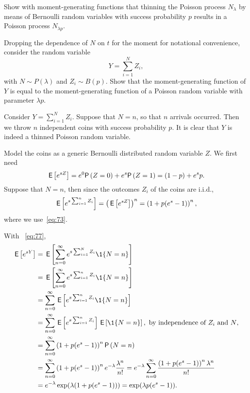 \begin{exercise}
 Show with moment-generating functions that thinning the Poisson process $N_\lambda$ by means of Bernoulli random variables with success probability $p$ results in a Poisson process $N_{\lambda p}$.
\begin{hint}
Dropping the dependence of $N$ on $t$ for the moment for notational convenience, consider the random variable 
 \begin{equation*}
 Y = \sum_{i=1}^N Z_i,
 \end{equation*}
 with $N\sim P(\lambda)$ and $Z_i\sim B(p)$. Show that the moment-generating function of $Y$ is equal to the moment-generating
 function of a Poisson random variable with parameter $\lambda p$.
\end{hint}
\begin{solution}
Consider $Y=\sum_{i=1}^N Z_i$. Suppose that $N=n$, so that $n$
arrivals occurred. Then we throw $n$ independent coins with success probability
$p$. It is clear that $Y$ is indeed a thinned Poisson random variable.

Model the coins as a generic Bernoulli distributed random variable
$Z$. We first need
\begin{equation*}
 \E{e^{s Z}} = e^0 \P{Z=0} + e^{s} \P{Z=1} = (1-p) + e^s p.
\end{equation*}
Suppose that $N=n$, then since the outcomes $Z_i$ of the coins are i.i.d.,
\begin{equation*}
\,\mathsf{E}\left[e^{s\sum_{i=1}^n Z_i}\right] = \left(\,\mathsf{E}\left[e^{s Z}\right]\right)^n = \left(1 + p (e^s - 1)\right)^n,
\end{equation*}
where we use~\cref{eq:73}. 

With ~\cref{eq:77}, 
\begin{align*}
 \E{e^{s Y}}
&= \E{\sum_{n=0}^\infty e^{s\sum_{i=1}^N Z_i} \1{N=n}} \\
&= \E{\sum_{n=0}^\infty e^{s\sum_{i=1}^n Z_i} \1{N=n}} \\
&= \sum_{n=0}^\infty \E{e^{s\sum_{i=1}^n Z_i} \1{N=n}} \\
&= \sum_{n=0}^\infty \E{e^{s\sum_{i=1}^n Z_i}} \E{\1{N=n}}, \text{ by independence of $Z_i$ and $N$}, \\
&= \sum_{n=0}^\infty \left(1+p(e^s-1)\right)^n \P{N=n} \\
&= \sum_{n=0}^\infty \left(1+p(e^s-1)\right)^n e^{-\lambda} \frac{\lambda^n}{n!}
= e^{-\lambda} \sum_{n=0}^\infty \frac{\left(1+p(e^s-1)\right)^n \lambda^n}{n!}\\
&= e^{-\lambda} \exp(\lambda (1+p(e^s-1))) = \exp(\lambda p (e^s - 1)).
\end{align*}
\end{solution}
\end{exercise} 


